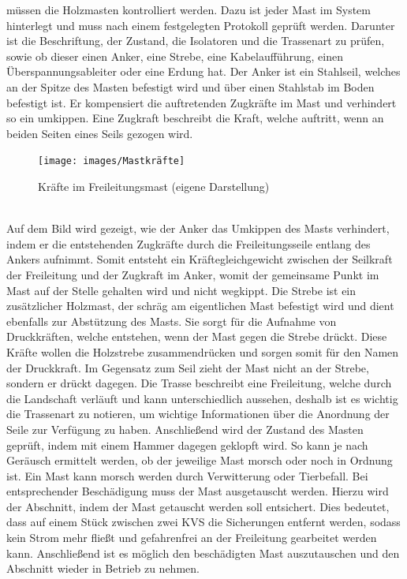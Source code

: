 müssen die Holzmasten kontrolliert werden. Dazu ist jeder Mast im System hinterlegt und muss nach einem festgelegten Protokoll geprüft werden. Darunter ist 
die Beschriftung, der Zustand, die Isolatoren und die Trassenart zu prüfen, sowie ob dieser einen Anker, eine Strebe, eine Kabelaufführung, einen 
Überspannungsableiter oder eine Erdung hat. Der Anker ist ein Stahlseil, welches an der Spitze des Masten befestigt wird und über einen Stahlstab im Boden 
befestigt ist. Er kompensiert die auftretenden Zugkräfte im Mast und verhindert so ein umkippen. Eine Zugkraft beschreibt die Kraft, welche auftritt, wenn 
an beiden Seiten eines Seils gezogen wird. 
\begin{figure}[hbt]
    \centering
    \texttt{[image: images/Mastkräfte]}
    \caption[Isolator]{Kräfte im Freileitungsmast (eigene Darstellung)}
    \label{fig:Kräfte im Mast}
\end{figure}
\\Auf dem Bild wird gezeigt, wie der Anker das Umkippen des Masts verhindert, indem er die entstehenden Zugkräfte durch die Freileitungsseile entlang des Ankers 
aufnimmt. Somit entsteht ein Kräftegleichgewicht zwischen der Seilkraft der Freileitung und der Zugkraft im Anker, womit der gemeinsame Punkt im Mast auf der 
Stelle gehalten wird und nicht wegkippt. Die Strebe ist ein zusätzlicher Holzmast, der schräg am eigentlichen Mast befestigt wird und dient ebenfalls zur 
Abstützung des Masts. Sie sorgt für die Aufnahme von Druckkräften, welche entstehen, wenn der Mast gegen die Strebe drückt. Diese Kräfte wollen die Holzstrebe
zusammendrücken und sorgen somit für den Namen der Druckkraft. Im Gegensatz zum Seil zieht der Mast nicht an der Strebe, sondern er drückt dagegen. Die 
Trasse beschreibt eine Freileitung, welche durch die Landschaft verläuft und kann unterschiedlich aussehen, deshalb ist es wichtig die Trassenart zu notieren,
um wichtige Informationen über die Anordnung der Seile zur Verfügung zu haben. Anschließend wird der Zustand des Masten geprüft, indem mit einem Hammer 
dagegen geklopft wird. So kann je nach Geräusch ermittelt werden, ob der jeweilige Mast morsch oder noch in Ordnung ist. Ein Mast kann morsch werden durch 
Verwitterung oder Tierbefall. Bei entsprechender Beschädigung muss der Mast ausgetauscht werden. Hierzu wird der Abschnitt, indem der Mast getauscht werden 
soll entsichert. Dies bedeutet, dass auf einem Stück zwischen zwei KVS die Sicherungen entfernt werden, sodass kein Strom mehr fließt und gefahrenfrei an 
der Freileitung gearbeitet werden kann. Anschließend ist es möglich den beschädigten Mast auszutauschen und den Abschnitt wieder in Betrieb zu nehmen. 
